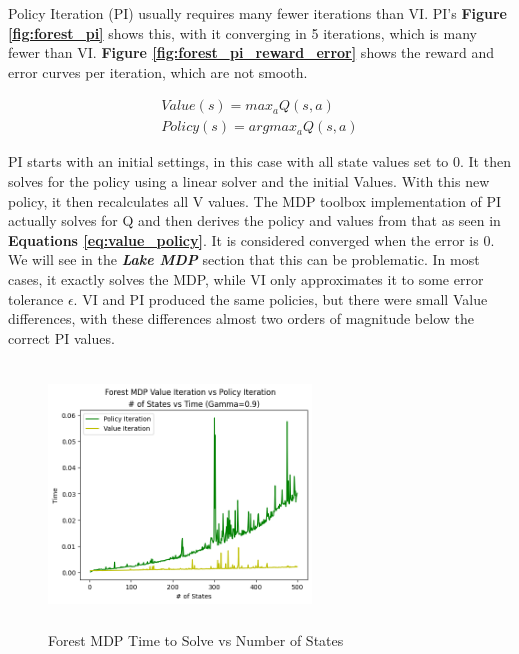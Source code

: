 \documentclass[letterpaper]{article} %
\begin{document}
Policy Iteration (PI) usually requires many fewer iterations than VI.  PI's \textbf{Figure \ref{fig:forest_pi}} shows this, with it converging in 5 iterations, which is many fewer than VI.   \textbf{Figure \ref{fig:forest_pi_reward_error}} shows the reward and error curves per iteration, which are not smooth.  

\begin{equation} \label{eq:value_policy}
\begin{gathered}
Value(s) = max_a Q(s,a)\\
Policy(s) = argmax_a Q(s,a)
\end{gathered}
\end{equation}

PI starts with an initial settings, in this case with all state values set to 0.  It then solves for the policy using a linear solver and the initial Values.  With this new policy, it then recalculates all V values. The MDP toolbox implementation of PI actually solves for Q and then derives the policy and values from that as seen in  \textbf{Equations \ref{eq:value_policy}}.  It is considered converged when the error is 0.  We will see in the \textbf{\emph{Lake MDP}} section that this can be problematic.  In most cases, it exactly solves the MDP, while VI only approximates it to some error tolerance $\epsilon$.  VI and PI produced the same policies, but there were small Value differences, with these differences almost two orders of magnitude below the correct PI values.

\begin{figure}[!htb]
\centering
\includegraphics[width=2.75in, height=2.75in]{Figures/Forest_MDP_Value_Iteration_vs_Policy_Iteration_num_of_States_vs_Time_Gamma_0_9.png}
\caption{Forest MDP Time to Solve vs Number of States}
\label{fig:forest_vi_pi_time}
\end{figure}
\end{document}
